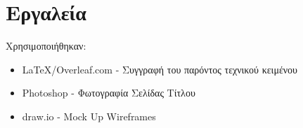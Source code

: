 \documentclass{article}
\begin{document}
\begin{center}
\end{center}

\begin{center}
\end{center}

\begin{center}
\end{center}

\section{Εργαλεία}
Χρησιμοποιήθηκαν:
\begin{itemize}
    \item \LaTeX/Overleaf.com - Συγγραφή του παρόντος τεχνικού κειμένου
    \item Photoshop - Φωτογραφία Σελίδας Τίτλου
    \item draw.io - Mock Up Wireframes
\end{itemize}
\end{document}
